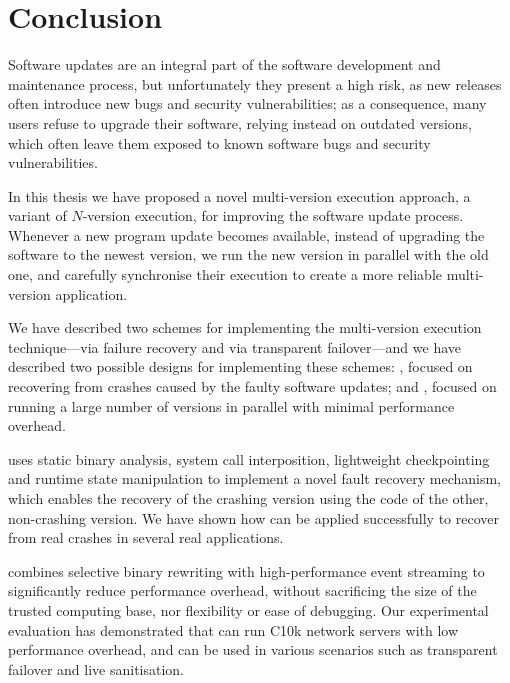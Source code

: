 \chapter{Conclusion}
\label{chap:conclusion}

Software updates are an integral part of the software development and
maintenance process, but unfortunately they present a high risk, as new
releases often introduce new bugs and security vulnerabilities; as a
consequence, many users refuse to upgrade their software, relying instead on
outdated versions, which often leave them exposed to known software bugs and
security vulnerabilities.

In this thesis we have proposed a novel multi-version execution approach, a
variant of $N$-version execution, for improving the software update process.
Whenever a new program update becomes available, instead of upgrading the
software to the newest version, we run the new version in parallel with the old
one, and carefully synchronise their execution to create a more reliable
multi-version application.

We have described two schemes for implementing the multi-version execution
technique---via failure recovery and via transparent failover---and we have
described two possible designs for implementing these schemes: \mx, focused on
recovering from crashes caused by the faulty software updates; and \varan,
focused on running a large number of versions in parallel with minimal
performance overhead.

\mx uses static binary analysis, system call interposition, lightweight
checkpointing and runtime state manipulation to implement a novel fault recovery
mechanism, which enables the recovery of the crashing version using the code
of the other, non-crashing version. We have shown how \mx can be applied
successfully to recover from real crashes in several real applications.

\varan combines selective binary rewriting with high-performance event
streaming to significantly reduce performance overhead, without sacrificing the
size of the trusted computing base, nor flexibility or ease of debugging.  Our
experimental evaluation has demonstrated that \varan can run C10k network
servers with low performance overhead, and can be used in various scenarios
such as transparent failover and live sanitisation.
